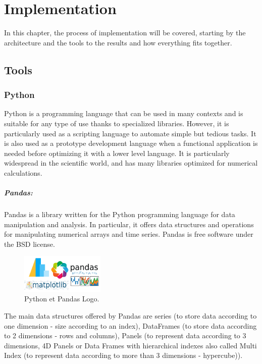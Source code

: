 
\chapter{Implementation}
In this chapter, the process of implementation will be covered, starting by the architecture and the tools to the results and how everything fits together.

\section{Tools}
\subsection{Python}
Python\cite{WelcomePythonOrg} is a programming language that can be used in many contexts and is suitable for any type of use thanks to specialized libraries. However, it is particularly used as a scripting language to automate simple but tedious tasks. It is also used as a prototype development language when a functional application is needed before optimizing it with a lower level language. It is particularly widespread in the scientific world, and has many libraries optimized for numerical calculations\cite{PythonLangageWikipedia}.
\paragraph{Pandas:} 

Pandas\cite{PandasPythonData} is a library written for the Python programming language for data manipulation and analysis. In particular, it offers data structures and operations for manipulating numerical arrays and time series. Pandas is free software under the BSD license.


\begin{figure}
	\vspace{-10pt}
	\includegraphics[width=4cm]{images/chapter4/python_pandas.png}
	\vspace{-10pt}
	\caption{{\footnotesize Python et Pandas Logo.}}
\end{figure}


The main data structures offered by Pandas are series (to store data according to one dimension - size according to an index), DataFrames (to store data according to 2 dimensions - rows and columns), Panels (to represent data according to 3 dimensions, 4D Panels or Data Frames with hierarchical indexes also called Multi Index (to represent data according to more than 3 dimensions - hypercube))\cite{Pandas2020}.



